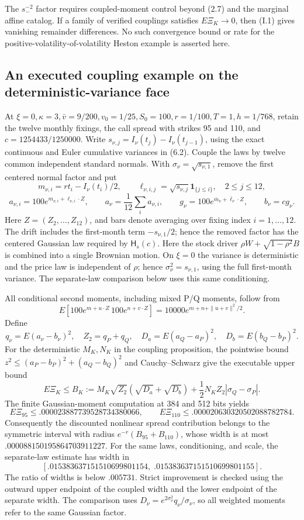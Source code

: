 \documentclass[11pt,a4paper]{article}
\begin{document}
The \(s_-^{-2}\) factor requires coupled-moment control beyond (2.7) and
the marginal affine catalog.
If a family of verified couplings satisfies \(E\Xi_K\to0\), then (I.1)
gives vanishing remainder differences. No such convergence bound or rate
for the positive-volatility-of-volatility Heston example is asserted here.

\subsection{An executed coupling example on the deterministic-variance face}

At \(\xi=0,\kappa=3,\bar v=9/200,v_0=1/25,S_0=100,r=1/100,T=1,h=1/768\), retain the twelve
monthly fixings, the call spread with strikes 95 and 110, and
\(c=1254433/1250000\). Write
\(s_{\nu,j}=I_\nu(t_j)-I_\nu(t_{j-1})\), using the exact continuous and
Euler cumulative variances in (6.2). Couple the laws by twelve common
independent standard normals. With \(\sigma_\nu=\sqrt{s_{\nu,1}}\), remove the first
centered normal factor and put
\[
m_{\nu,i}=rt_i-I_\nu(t_i)/2,\qquad
\ell_{\nu,i,j}=\sqrt{s_{\nu,j}}\mathbf1_{\{j\le i\}},\quad 2\le j\le12,
\]
\[
a_{\nu,i}=100e^{m_{\nu,i}+\ell_{\nu,i}\cdot Z},\qquad
a_\nu=\frac1{12}\sum_i a_{\nu,i},\qquad
g_\nu=100e^{\bar m_\nu+\bar\ell_\nu\cdot Z},\qquad b_\nu=cg_\nu.
\]
Here \(Z=(Z_2,\ldots,Z_{12})\), and bars denote averaging over fixing
index \(i=1,\ldots,12\).
The drift includes the first-month term \(-s_{\nu,1}/2\); hence the removed
factor has the centered Gaussian law required by \(\mathsf H_s(c)\).
Here the stock driver \(\rho W+\sqrt{1-\rho^2}B\) is combined into a single
Brownian motion. On \(\xi=0\) the variance is deterministic and the price
law is independent of \(\rho\); hence \(\sigma_\nu^2=s_{\nu,1}\), using
the full first-month variance. The separate-law comparison below uses this
same conditioning.

All conditional second moments, including mixed P/Q moments, follow from
\[
E\!\left[100e^{m+u\cdot Z}\,100e^{n+v\cdot Z}\right]
=10000e^{m+n+\|u+v\|^2/2}.
\]
Define
\[
q_\nu=E(a_\nu-b_\nu)^2,\quad Z_2=q_P+q_Q,\quad
D_a=E(a_Q-a_P)^2,\quad D_b=E(b_Q-b_P)^2.
\]
For the deterministic \(M_K,N_K\) in the coupling proposition, the
pointwise bound \(z^2\le(a_P-b_P)^2+(a_Q-b_Q)^2\) and
Cauchy--Schwarz give the executable upper bound
\[
E\Xi_K\le B_K:=
M_K\sqrt{Z_2}(\sqrt{D_a}+\sqrt{D_b})
+\frac12N_KZ_2|\sigma_Q-\sigma_P|.
\]
The finite Gaussian-moment computation at 384 and 512 bits yields
\[
E\Xi_{95}\le .000023887739528734380066,\qquad
E\Xi_{110}\le .000020630320502088782784.
\]
Consequently the discounted nonlinear spread contribution belongs to the
symmetric interval with radius \(e^{-r}(B_{95}+B_{110})\), whose width is
at most \(.000088150195864703911227\). For the same laws, conditioning,
and scale, the separate-law estimate has width in
\[
[.015383637151510699801154,\;.015383637151510699801155].
\]
The ratio of widths is below \(.005731\). Strict improvement is checked
using the outward upper endpoint of the coupled width and the lower endpoint
of the separate width. The comparison uses
\(D_\nu=e^{2\sigma_\nu^2}q_\nu/\sigma_\nu\), so all weighted moments
refer to the same Gaussian factor.
\end{document}
